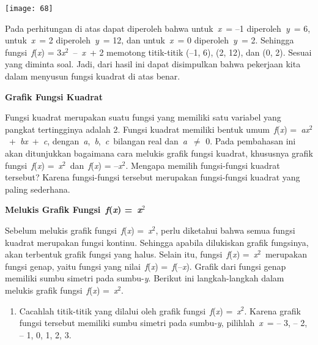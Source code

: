 \documentclass[11pt,fleqn]{book} %
\begin{document}
\begin{myEnumerate}
\begin{itemize}
\begin{center}
\noindent \texttt{[image: 68]}
\end{center}

\noindent Pada perhitungan di atas dapat diperoleh bahwa untuk~\textit{x}~= --1 diperoleh~\textit{y}~= 6, untuk~\textit{x}~= 2 diperoleh~\textit{y}~= 12, dan untuk~\textit{x}~= 0 diperoleh~\textit{y}~= 2. Sehingga fungsi~\textit{f}(\textit{x}) = 3\textit{x}${}^{2}$~--~\textit{x}~+ 2 memotong titik-titik (--1, 6), (2, 12), dan (0, 2). Sesuai yang diminta soal. Jadi, dari hasil ini dapat disimpulkan bahwa pekerjaan kita dalam menyusun fungsi kuadrat di atas benar.

\noindent \textbf{Grafik Fungsi Kuadrat}

\noindent Fungsi kuadrat merupakan suatu fungsi yang memiliki satu variabel yang pangkat tertingginya adalah 2. Fungsi kuadrat memiliki bentuk umum~\textit{f}(\textit{x}) =~\textit{ax}${}^{2}$~+~\textit{bx}~+~\textit{c}, dengan~\textit{a},~\textit{b},~\textit{c}~bilangan real dan~\textit{a}~$\mathrm{\neq}$ 0. Pada pembahasan ini akan ditunjukkan bagaimana cara melukis grafik fungsi kuadrat, khususnya grafik fungsi~\textit{f}(\textit{x}) =~\textit{x}${}^{2}$~dan~\textit{f}(\textit{x}) = --\textit{x}${}^{2}$. Mengapa memilih fungsi-fungsi kuadrat tersebut? Karena fungsi-fungsi tersebut merupakan fungsi-fungsi kuadrat yang paling sederhana.

\noindent \textbf{Melukis Grafik Fungsi~\textit{f}(\textit{x}) =~\textit{x}${}^{2}$}

\noindent Sebelum melukis grafik fungsi~\textit{f}(\textit{x}) =~\textit{x}${}^{2}$, perlu diketahui bahwa semua fungsi kuadrat merupakan fungsi kontinu. Sehingga apabila dilukiskan grafik fungsinya, akan terbentuk grafik fungsi yang halus. Selain itu, fungsi~\textit{f}(\textit{x}) =~\textit{x}${}^{2}$~merupakan fungsi genap, yaitu fungsi yang nilai~\textit{f}(\textit{x}) =~\textit{f}(--\textit{x}). Grafik dari fungsi genap memiliki sumbu simetri pada sumbu-\textit{y}. Berikut ini langkah-langkah dalam melukis grafik fungsi~\textit{f}(\textit{x}) =~\textit{x}${}^{2}$.

\begin{enumerate}
\item  Cacahlah titik-titik yang dilalui oleh grafik fungsi~\textit{f}(\textit{x}) =~\textit{x}${}^{2}$. Karena grafik fungsi tersebut memiliki sumbu simetri pada sumbu-\textit{y}, pilihlah~\textit{x}~= -- 3, -- 2, -- 1, 0, 1, 2, 3.\textbf{}
\end{enumerate}


\end{itemize}
\end{myEnumerate}
\end{document}
